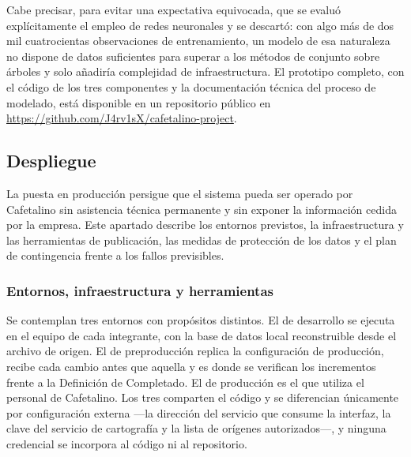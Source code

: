 Cabe precisar, para evitar una expectativa equivocada, que se evaluó explícitamente el empleo de redes neuronales y se descartó: con algo más de dos mil cuatrocientas observaciones de entrenamiento, un modelo de esa naturaleza no dispone de datos suficientes para superar a los métodos de conjunto sobre árboles y solo añadiría complejidad de infraestructura. El prototipo completo, con el código de los tres componentes y la documentación técnica del proceso de modelado, está disponible en un repositorio público en \url{https://github.com/J4rv1sX/cafetalino-project}.

\subsection{Despliegue}\label{despliegue}

La puesta en producción persigue que el sistema pueda ser operado por Cafetalino sin asistencia técnica permanente y sin exponer la información cedida por la empresa. Este apartado describe los entornos previstos, la infraestructura y las herramientas de publicación, las medidas de protección de los datos y el plan de contingencia frente a los fallos previsibles.

\subsubsection{Entornos, infraestructura y herramientas}\label{entornos-infraestructura-y-herramientas}

Se contemplan tres entornos con propósitos distintos. El de desarrollo se ejecuta en el equipo de cada integrante, con la base de datos local reconstruible desde el archivo de origen. El de preproducción replica la configuración de producción, recibe cada cambio antes que aquella y es donde se verifican los incrementos frente a la Definición de Completado. El de producción es el que utiliza el personal de Cafetalino. Los tres comparten el código y se diferencian únicamente por configuración externa —la dirección del servicio que consume la interfaz, la clave del servicio de cartografía y la lista de orígenes autorizados—, y ninguna credencial se incorpora al código ni al repositorio.

